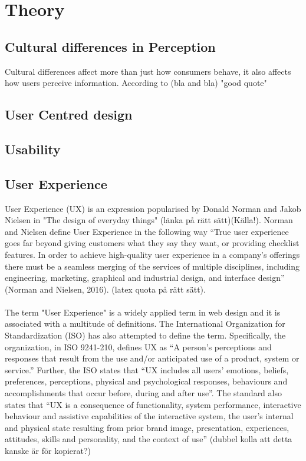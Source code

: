 
\chapter{Theory} %

\label{Theory} %




\section{Cultural differences in Perception}
Cultural differences affect more than just how consumers behave, it also affects how users perceive information. According to (bla and bla) "good quote" \cite{Holistic_vs_Analytic}
\section{User Centred design}
\section{Usability}
\section{User Experience}
User Experience (UX) is an expression popularised by Donald Norman and Jakob Nielsen in "The design of everyday things" (länka på rätt sätt)(Källa!). Norman and Nielsen define User Experience in the following way “True user experience goes far beyond giving customers what they say they want, or providing checklist features. In order to achieve high-quality user experience in a company’s offerings there must be a seamless merging of the services of multiple disciplines, including engineering, marketing, graphical and industrial design, and interface design” (Norman and Nielsen, 2016). (latex quota på rätt sätt). 
\\\\
The term "User Experience" is a widely applied term in web design and it is associated with a multitude of definitions. The International Organization for Standardization (ISO) has also attempted to define the term. Specifically, the organization, in ISO 9241-210, defines UX as “A person's perceptions and responses that result from the use and/or anticipated use of a product, system or service.” Further, the ISO states that “UX includes all users' emotions, beliefs, preferences, perceptions, physical and psychological responses, behaviours and accomplishments that occur before, during and after use”. The standard also states that “UX is a consequence of functionality, system performance, interactive behaviour and assistive capabilities of the interactive system, the user's internal and physical state resulting from prior brand image, presentation, experiences, attitudes, skills and personality, and the context of use” (dubbel kolla att detta kanske är för kopierat?)


